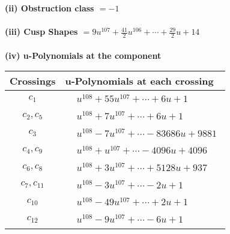 \documentclass[1p]{elsarticle_modified}
\theoremstyle{definition}
\begin{document}
\flushleft \textbf{(ii) Obstruction class $= -1$}\\~\\
\flushleft \textbf{(iii) Cusp Shapes $= 9 u^{107}+\frac{41}{2} u^{106}+\cdots+\frac{29}{2} u+14$}\\~\\
\newpage\renewcommand{\arraystretch}{1}
\flushleft \textbf{(iv) u-Polynomials at the component}\newline \\
\begin{tabular}{m{50pt}|m{274pt}}
Crossings & \hspace{64pt}u-Polynomials at each crossing \\
\hline $$\begin{aligned}c_{1}\end{aligned}$$&$\begin{aligned}
&u^{108}+55 u^{107}+\cdots+6 u+1
\end{aligned}$\\
\hline $$\begin{aligned}c_{2},c_{5}\end{aligned}$$&$\begin{aligned}
&u^{108}+7 u^{107}+\cdots+6 u+1
\end{aligned}$\\
\hline $$\begin{aligned}c_{3}\end{aligned}$$&$\begin{aligned}
&u^{108}-7 u^{107}+\cdots-83686 u+9881
\end{aligned}$\\
\hline $$\begin{aligned}c_{4},c_{9}\end{aligned}$$&$\begin{aligned}
&u^{108}+u^{107}+\cdots-4096 u+4096
\end{aligned}$\\
\hline $$\begin{aligned}c_{6},c_{8}\end{aligned}$$&$\begin{aligned}
&u^{108}+3 u^{107}+\cdots+5128 u+937
\end{aligned}$\\
\hline $$\begin{aligned}c_{7},c_{11}\end{aligned}$$&$\begin{aligned}
&u^{108}-3 u^{107}+\cdots-2 u+1
\end{aligned}$\\
\hline $$\begin{aligned}c_{10}\end{aligned}$$&$\begin{aligned}
&u^{108}-49 u^{107}+\cdots+2 u+1
\end{aligned}$\\
\hline $$\begin{aligned}c_{12}\end{aligned}$$&$\begin{aligned}
&u^{108}-9 u^{107}+\cdots-6 u+1
\end{aligned}$\\
\hline
\end{tabular}\\~\\
\end{document}
